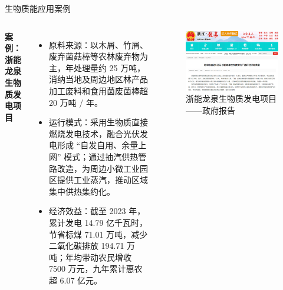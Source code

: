 \documentclass[aspectratio=169]{beamer}
\begin{document}
\begin{frame}{生物质能应用案例}
  \begin{columns}
    \textbf{案例：浙能龙泉生物质发电项目}
    \begin{itemize}
      \item 原料来源：以木屑、竹屑、废弃菌菇棒等农林废弃物为主，年处理量约 25 万吨，消纳当地及周边地区林产品加工废料和食用菌废菌棒超 20 万吨 / 年。
      \item 运行模式：采用生物质直接燃烧发电技术，融合光伏发电形成 “自发自用、余量上网” 模式；通过抽汽供热管路改造，为周边小微工业园区提供工业蒸汽，推动区域集中供热集约化。
      \item 经济效益：截至 2023 年，累计发电 14.79 亿千瓦时，节省标煤 71.01 万吨，减少二氧化碳排放 194.71 万吨；年均带动农民增收 7500 万元，九年累计惠农超 6.07 亿元。
    \end{itemize}
    \begin{figure}
      \centering
      \caption{浙能龙泉生物质发电项目——政府报告}
      \includegraphics[width=\textwidth]{fig/浙能龙泉生物质发电项目.png}
    \end{figure}
  \end{columns}
\end{frame}
\end{document}

